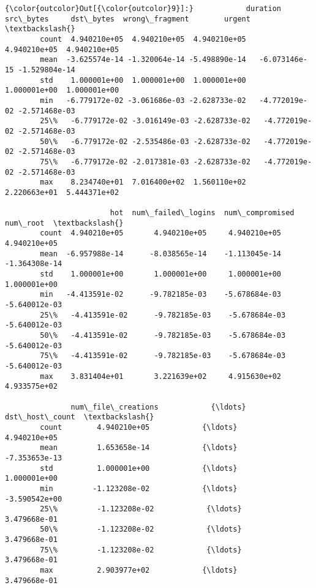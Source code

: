 \documentclass[11pt]{article}
\begin{document}
\begin{Verbatim}[commandchars=\\\{\}]
{\color{outcolor}Out[{\color{outcolor}9}]:}            duration     src\_bytes     dst\_bytes  wrong\_fragment        urgent  \textbackslash{}
        count  4.940210e+05  4.940210e+05  4.940210e+05    4.940210e+05  4.940210e+05   
        mean  -3.625574e-14 -1.320064e-14 -5.498890e-14   -6.073146e-15 -1.529804e-14   
        std    1.000001e+00  1.000001e+00  1.000001e+00    1.000001e+00  1.000001e+00   
        min   -6.779172e-02 -3.061686e-03 -2.628733e-02   -4.772019e-02 -2.571468e-03   
        25\%   -6.779172e-02 -3.016149e-03 -2.628733e-02   -4.772019e-02 -2.571468e-03   
        50\%   -6.779172e-02 -2.535486e-03 -2.628733e-02   -4.772019e-02 -2.571468e-03   
        75\%   -6.779172e-02 -2.017381e-03 -2.628733e-02   -4.772019e-02 -2.571468e-03   
        max    8.234740e+01  7.016400e+02  1.560110e+02    2.220663e+01  5.444371e+02   
        
                        hot  num\_failed\_logins  num\_compromised      num\_root  \textbackslash{}
        count  4.940210e+05       4.940210e+05     4.940210e+05  4.940210e+05   
        mean  -6.957988e-14      -8.038565e-14    -1.113045e-14 -1.364308e-14   
        std    1.000001e+00       1.000001e+00     1.000001e+00  1.000001e+00   
        min   -4.413591e-02      -9.782185e-03    -5.678684e-03 -5.640012e-03   
        25\%   -4.413591e-02      -9.782185e-03    -5.678684e-03 -5.640012e-03   
        50\%   -4.413591e-02      -9.782185e-03    -5.678684e-03 -5.640012e-03   
        75\%   -4.413591e-02      -9.782185e-03    -5.678684e-03 -5.640012e-03   
        max    3.831404e+01       3.221639e+02     4.915630e+02  4.933575e+02   
        
               num\_file\_creations            {\ldots}             dst\_host\_count  \textbackslash{}
        count        4.940210e+05            {\ldots}               4.940210e+05   
        mean         1.653658e-14            {\ldots}              -7.353653e-13   
        std          1.000001e+00            {\ldots}               1.000001e+00   
        min         -1.123208e-02            {\ldots}              -3.590542e+00   
        25\%         -1.123208e-02            {\ldots}               3.479668e-01   
        50\%         -1.123208e-02            {\ldots}               3.479668e-01   
        75\%         -1.123208e-02            {\ldots}               3.479668e-01   
        max          2.903977e+02            {\ldots}               3.479668e-01   
        

\end{Verbatim}
\end{document}
